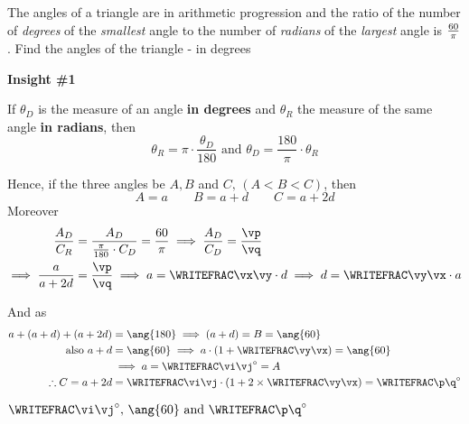 

\FRACTIONSIMPLIFY{}\vp\vq
\MULTIPLY{}\vr
\SUBTRACT\vq\vp\vs
\FRACTIONSIMPLIFY\vr\vs\vx\vy
\FRACADD\vy{}\vm\vn
\FRACMULT\vn{}\vi\vj

\FRACMULT\vy{}\vt\vu
\FRACADD\vt{}\vv\vw
\FRACMULT\vv\vw\vi\vj\p\q

\question[3] The angles of a triangle are in arithmetic progression and the ratio of 
the number of \textit{degrees} of the \textit{smallest} angle to the number of 
\textit{radians} of the \textit{largest} angle is $\frac{60}\pi$. Find the angles 
of the triangle - in degrees 

\watchout

\begin{solution}[\halfpage]
  \textbf{Insight \#1}
  
  If $\theta_D$ is the measure of an angle \textbf{in degrees} and $\theta_R$ the measure 
  of the same angle \textbf{in radians}, then 
  \[ \theta_R = \pi\cdot\dfrac{\theta_D}{180}\text{ and }\theta_D = \dfrac{180}\pi\cdot\theta_R \]

  Hence, if the three angles be $A,B$ and $C,\,(A < B < C)$, then 
  \[ A = a\qquad B = a+d\qquad C = a + 2d \] 
  Moreover
  \begin{align}
    \dfrac{A_D}{C_R} &= \dfrac{A_D}{\frac\pi{180}\cdot C_D} = \dfrac\va\pi\implies\dfrac{A_D}{C_D}=\dfrac\vp\vq \\
    \implies \dfrac{a}{a+2d} &= \dfrac\vp\vq\implies a = \WRITEFRAC\vx\vy\cdot d\implies d = \WRITEFRAC\vy\vx\cdot a 
  \end{align} 

  And as 
  \begin{align}
    a + (a+d) + (a+2d) &=\ang{180}\implies (a+d) = B = \ang{60} \\
    \text{also } a+d &=\ang{60}\implies a\cdot\left(1 + \WRITEFRAC\vy\vx\right) = \ang{60} \\
    &\implies a = \WRITEFRAC\vi\vj^\circ = A \\
    \therefore C = a + 2d &= \WRITEFRAC\vi\vj\cdot\left( 1+2\times\WRITEFRAC\vy\vx \right) = \WRITEFRAC\p\q^\circ
  \end{align}
\end{solution}

\ifprintanswers
  \begin{codex}
    $\WRITEFRAC\vi\vj^\circ,\,\ang{60}\text{ and }\WRITEFRAC\p\q^\circ$
  \end{codex}
\fi
